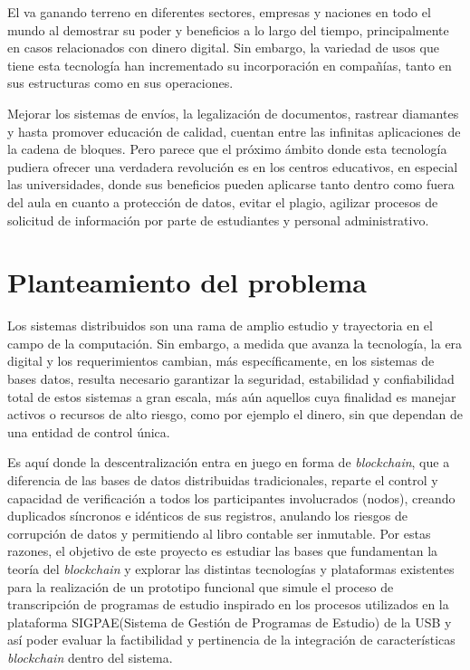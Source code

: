 El  va ganando terreno en diferentes sectores, empresas y naciones en todo el mundo al demostrar su poder y beneficios a lo largo del tiempo, principalmente en casos relacionados con dinero digital. Sin embargo, la variedad de usos que tiene esta tecnología han incrementado su incorporación en compañías, tanto en sus estructuras como en sus operaciones. 

Mejorar los sistemas de envíos, la legalización de documentos, rastrear diamantes y hasta promover educación de calidad, cuentan entre las infinitas aplicaciones de la cadena de bloques. Pero parece que el próximo ámbito donde esta tecnología pudiera ofrecer una verdadera revolución es en los centros educativos, en especial las universidades, donde sus beneficios pueden aplicarse tanto dentro como fuera del aula en cuanto a protección de datos, evitar el plagio, agilizar procesos de solicitud de información por parte de estudiantes y personal administrativo.


\section{Planteamiento del problema}

Los  sistemas distribuidos  son una rama de amplio estudio y trayectoria en el campo de la computación. Sin embargo, a medida que avanza la tecnología, la era digital y los requerimientos cambian, más específicamente, en los sistemas de bases datos, resulta necesario garantizar la seguridad, estabilidad y confiabilidad total de estos sistemas a gran escala, más aún aquellos cuya finalidad es manejar activos o recursos de alto riesgo, como por ejemplo el dinero, sin que dependan de una entidad de control única. 

Es aquí donde la descentralización entra en juego en forma de \textit{blockchain}, que a diferencia de las bases de datos distribuidas tradicionales, reparte el control y capacidad de verificación a todos los participantes involucrados (nodos), creando duplicados síncronos e idénticos de sus registros,  anulando los riesgos de corrupción de datos y permitiendo al libro contable ser inmutable. Por estas razones, el objetivo de este proyecto es estudiar las bases que fundamentan la teoría del \textit{blockchain} y explorar las distintas tecnologías y plataformas existentes para la realización de un prototipo funcional que simule el proceso de transcripción de programas de estudio inspirado en los procesos utilizados en la plataforma SIGPAE(Sistema de Gestión de Programas de Estudio) de la USB y así poder evaluar la factibilidad  y pertinencia de la  integración de características \textit{blockchain} dentro del sistema.


